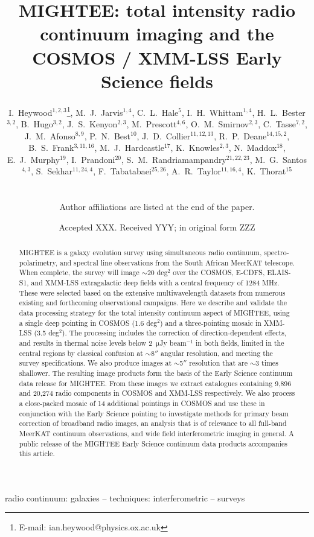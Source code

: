 \documentclass[usenatbib,usedcolumn]{mnras}
\title[MIGHTEE continuum processing and Early Science]{MIGHTEE: total intensity radio continuum imaging and the COSMOS / XMM-LSS Early Science fields}
\author[Heywood et al.]
{\parbox{\textwidth}{
\begin{flushleft}
I.~Heywood$^{1,2,3}$\thanks{E-mail: ian.heywood@physics.ox.ac.uk},
M.~J.~Jarvis$^{1,4}$,
C.~L.~Hale$^{5}$,
I.~H.~Whittam$^{1,4}$,
H.~L.~Bester$^{3,2}$,
B.~Hugo$^{3,2	}$,
J.~S.~Kenyon$^{2,3}$,
M.~Prescott$^{4,6}$,
O.~M.~Smirnov$^{2,3}$,
C.~Tasse$^{7,2}$,
J.~M.~Afonso$^{8,9}$,
P.~N.~Best$^{10}$,
J.~D.~Collier$^{11,12,13}$,
R.~P.~Deane$^{14,15,2}$,
B.~S.~Frank$^{3,11,16}$,
M.~J.~Hardcastle$^{17}$,
K.~Knowles$^{2,3}$,
N.~Maddox$^{18}$,
E.~J.~Murphy$^{19}$,
I.~Prandoni$^{20}$,
S.~M.~Randriamampandry$^{21,22,23}$,
M.~G.~Santos$^{4,3}$,
S.~Sekhar$^{11,24,4}$,
F.~Tabatabaei$^{25,26}$,
A.~R.~Taylor$^{11,16,4}$,
K.~Thorat$^{15}$
\\
\end{flushleft}
}
\footnotesize
\\
Author affiliations are listed at the end of the paper.
}
\date{Accepted XXX. Received YYY; in original form ZZZ}
\begin{document}
\label{firstpage}
\pagerange{\pageref{firstpage}--\pageref{lastpage}}
\maketitle

\begin{abstract}

MIGHTEE is a galaxy evolution survey using simultaneous radio continuum, spectro-polarimetry, and spectral line observations from the South African MeerKAT telescope. When complete, the survey will image $\sim$20 deg$^{2}$ over the COSMOS, E-CDFS, ELAIS-S1, and XMM-LSS extragalactic deep fields with a central frequency of 1284 MHz. These were selected based on the extensive multiwavelength datasets from numerous existing and forthcoming observational campaigns. Here we describe and validate the data processing strategy for the total intensity continuum aspect of MIGHTEE, using a single deep pointing in COSMOS (1.6 deg$^{2}$) and a three-pointing mosaic in XMM-LSS (3.5 deg$^{2}$). The processing includes the correction of direction-dependent effects, and results in thermal noise levels below 2~$\mathrm{\mu}$Jy beam$^{-1}$ in both fields, limited in the central regions by classical confusion at $\sim$8$''$ angular resolution, and meeting the survey specifications. We also produce images at $\sim$5$''$ resolution that are $\sim$3 times shallower. The resulting image products form the basis of the Early Science continuum data release for MIGHTEE. From these images we extract catalogues containing 9,896 and 20,274 radio components in COSMOS and XMM-LSS respectively. We also process a close-packed mosaic of 14 additional pointings in COSMOS and use these in conjunction with the Early Science pointing to investigate methods for primary beam correction of broadband radio images, an analysis that is of relevance to all full-band MeerKAT continuum observations, and wide field interferometric imaging in general. A public release of the MIGHTEE Early Science continuum data products accompanies this article.


\end{abstract}

\begin{keywords}
radio continuum: galaxies -- techniques: interferometric -- surveys
\end{keywords}

\end{document}
